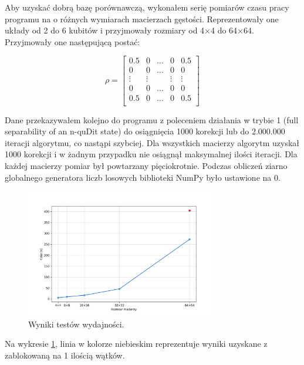 \documentclass[10pt, a4paper]{article}
\begin{document}
\begin{sloppypar}
    Aby uzyskać dobrą bazę porównawczą, wykonałem serię pomiarów czasu pracy programu na
    o różnych wymiarach macierzach gęstości. Reprezentowały one układy od 2 do 6 kubitów
    i przyjmowały rozmiary od 4×4 do 64×64. Przyjmowały one następującą postać:

    \[
      \rho =
      \begin{bmatrix}
        0.5    & 0      & \hdots & 0      & 0.5    \\
        0      & 0      & \hdots & 0      & 0      \\
        \vdots & \vdots &        & \vdots & \vdots \\
        0      & 0      & \hdots & 0      & 0      \\
        0.5    & 0      & \hdots & 0      & 0.5    \\
      \end{bmatrix}
    \]

    Dane przekazywałem kolejno do programu z poleceniem działania w trybie 1 (full
    separability of an n-quDit state) do osiągnięcia 1000 korekcji lub do 2.000.000
    iteracji algorytmu, co nastąpi szybciej. Dla wszystkich macierzy algorytm uzyskał
    1000 korekcji i w żadnym przypadku nie osiągnął maksymalnej ilości iteracji. Dla każdej
    macierzy pomiar był powtarzany pięciokrotnie. Podczas obliczeń ziarno globalnego
    generatora liczb losowych biblioteki NumPy było ustawione na 0.

    \FloatBarrier
    \begin{figure}[h]
      \centering
      \includegraphics[width=0.75\textwidth]{"resources/benchmark_1/plot.png"}
      \caption{Wyniki testów wydajności.}
      \label{pre-perf}
    \end{figure}
    \FloatBarrier

    Na wykresie \ref{pre-perf}, linia w kolorze niebieskim reprezentuje wyniki uzyskane z
    zablokowaną na 1 ilością wątków.


\end{sloppypar}
\end{document}
